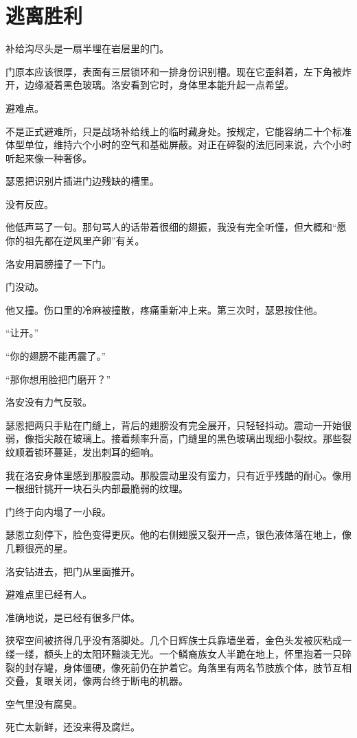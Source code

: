 \chapter{逃离胜利}

补给沟尽头是一扇半埋在岩层里的门。

门原本应该很厚，表面有三层锁环和一排身份识别槽。现在它歪斜着，左下角被炸开，边缘凝着黑色玻璃。洛安看到它时，身体里本能升起一点希望。

避难点。

不是正式避难所，只是战场补给线上的临时藏身处。按规定，它能容纳二十个标准体型单位，维持六个小时的空气和基础屏蔽。对正在碎裂的法厄同来说，六个小时听起来像一种奢侈。

瑟恩把识别片插进门边残缺的槽里。

没有反应。

他低声骂了一句。那句骂人的话带着很细的翅振，我没有完全听懂，但大概和“愿你的祖先都在逆风里产卵”有关。

洛安用肩膀撞了一下门。

门没动。

他又撞。伤口里的冷麻被撞散，疼痛重新冲上来。第三次时，瑟恩按住他。

“让开。”

“你的翅膀不能再震了。”

“那你想用脸把门磨开？”

洛安没有力气反驳。

瑟恩把两只手贴在门缝上，背后的翅膀没有完全展开，只轻轻抖动。震动一开始很弱，像指尖敲在玻璃上。接着频率升高，门缝里的黑色玻璃出现细小裂纹。那些裂纹顺着锁环蔓延，发出刺耳的细响。

我在洛安身体里感到那股震动。那股震动里没有蛮力，只有近乎残酷的耐心。像用一根细针挑开一块石头内部最脆弱的纹理。

门终于向内塌了一小段。

瑟恩立刻停下，脸色变得更灰。他的右侧翅膜又裂开一点，银色液体落在地上，像几颗很亮的星。

洛安钻进去，把门从里面推开。

避难点里已经有人。

准确地说，是已经有很多尸体。

狭窄空间被挤得几乎没有落脚处。几个日辉族士兵靠墙坐着，金色头发被灰粘成一缕一缕，额头上的太阳环黯淡无光。一个鳞裔族女人半跪在地上，怀里抱着一只碎裂的封存罐，身体僵硬，像死前仍在护着它。角落里有两名节肢族个体，肢节互相交叠，复眼关闭，像两台终于断电的机器。

空气里没有腐臭。

死亡太新鲜，还没来得及腐烂。


